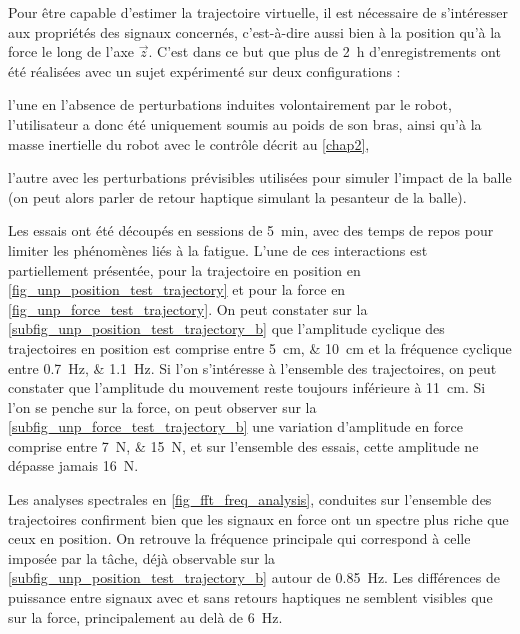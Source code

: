 Pour être capable d'estimer la trajectoire virtuelle, il est nécessaire de s'intéresser aux propriétés des signaux concernés, c'est-à-dire aussi bien à la position qu'à la force le long de l'axe $\vec{z}$. C'est dans ce but que plus de \SI{2}{\hour} d'enregistrements ont été réalisées avec un sujet expérimenté sur deux configurations : 
\begin{enumerate*}[label=\roman*)]
	\item\label{item_unp_session} l'une en l'absence de perturbations induites volontairement par le robot, l'utilisateur a donc été uniquement soumis au poids de son bras, ainsi qu'à la masse inertielle du robot avec le contrôle décrit au \cref{chap2},
	\item\label{item_haptic_session} l'autre avec les perturbations prévisibles utilisées pour simuler l'impact de la balle (on peut alors parler de retour haptique simulant la pesanteur de la balle).
\end{enumerate*}
Les essais ont été découpés en sessions de \SI{5}{\minute}, avec des temps de repos pour limiter les phénomènes liés à la fatigue. L'une de ces interactions est partiellement présentée, pour la trajectoire en position en \cref{fig_unp_position_test_trajectory} et pour la force en \cref{fig_unp_force_test_trajectory}. On peut constater sur la \cref{subfig_unp_position_test_trajectory_b} que l'amplitude cyclique des trajectoires en position est comprise entre  \SIlist{5;10}{\centi\meter} et la fréquence cyclique entre \SIlist{0.7;1.1}{\hertz}. Si l'on s'intéresse à l'ensemble des trajectoires, on peut constater que l'amplitude du mouvement reste toujours inférieure à \SI{11}{\centi\meter}. Si l'on se penche sur la force, on peut observer sur la \cref{subfig_unp_force_test_trajectory_b} une variation d'amplitude en force comprise entre \SIlist{7;15}{\newton}, et sur l'ensemble des essais, cette amplitude ne dépasse jamais \SI{16}{\newton}.





Les analyses spectrales en \cref{fig_fft_freq_analysis}, conduites sur l'ensemble des trajectoires confirment bien que les signaux en force ont un spectre plus riche que ceux en position. On retrouve la fréquence principale qui correspond à celle imposée par la tâche, déjà observable sur la \cref{subfig_unp_position_test_trajectory_b} autour de \SI{0.85}{\hertz}. Les différences de puissance entre signaux avec et sans retours haptiques ne semblent visibles que sur la force, principalement au delà de \SI{6}{\hertz}.

